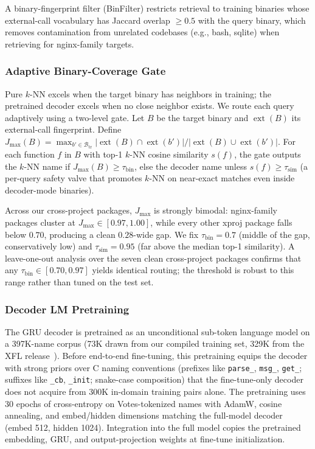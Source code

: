 \documentclass[sigconf,nonacm]{acmart}
\begin{document}
A binary-fingerprint filter (BinFilter) restricts retrieval to training binaries whose external-call vocabulary has Jaccard overlap $\ge 0.5$ with the query binary, which removes contamination from unrelated codebases (e.g., bash, sqlite) when retrieving for nginx-family targets.

\subsubsection{Adaptive Binary-Coverage Gate}
\label{sec:adaptive-gate}

Pure $k$-NN excels when the target binary has neighbors in training; the pretrained decoder excels when no close neighbor exists. We route each query adaptively using a two-level gate. Let $B$ be the target binary and $\operatorname{ext}(B)$ its external-call fingerprint. Define
$J_{\max}(B) = \max_{b' \in \mathcal{B}_{\text{tr}}} |\operatorname{ext}(B) \cap \operatorname{ext}(b')| / |\operatorname{ext}(B) \cup \operatorname{ext}(b')|$.
For each function $f$ in $B$ with top-1 $k$-NN cosine similarity $s(f)$, the gate outputs the $k$-NN name if $J_{\max}(B) \ge \tau_{\text{bin}}$, else the decoder name unless $s(f) \ge \tau_{\text{sim}}$ (a per-query safety valve that promotes $k$-NN on near-exact matches even inside decoder-mode binaries).

Across our cross-project packages, $J_{\max}$ is strongly bimodal: nginx-family packages cluster at $J_{\max} \in [0.97, 1.00]$, while every other xproj package falls below $0.70$, producing a clean $0.28$-wide gap. We fix $\tau_{\text{bin}}{=}0.7$ (middle of the gap, conservatively low) and $\tau_{\text{sim}}{=}0.95$ (far above the median top-1 similarity). A leave-one-out analysis over the seven clean cross-project packages confirms that any $\tau_{\text{bin}} \in [0.70, 0.97]$ yields identical routing; the threshold is robust to this range rather than tuned on the test set.

\subsubsection{Decoder LM Pretraining}
The GRU decoder is pretrained as an unconditional sub-token language model on a 397K-name corpus (73K drawn from our compiled training set, 329K from the XFL release~\cite{xfl}). Before end-to-end fine-tuning, this pretraining equips the decoder with strong priors over C naming conventions (prefixes like \texttt{parse\_}, \texttt{msg\_}, \texttt{get\_}; suffixes like \texttt{\_cb}, \texttt{\_init}; snake-case composition) that the fine-tune-only decoder does not acquire from 300K in-domain training pairs alone. The pretraining uses 30 epochs of cross-entropy on Votes-tokenized names with AdamW, cosine annealing, and embed/hidden dimensions matching the full-model decoder (embed 512, hidden 1024). Integration into the full model copies the pretrained embedding, GRU, and output-projection weights at fine-tune initialization.
\end{document}
